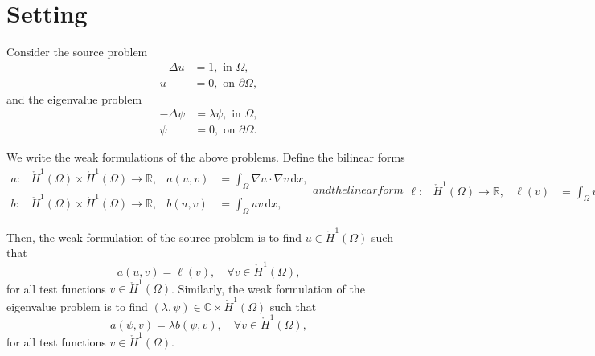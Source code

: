 \section{Setting}

Consider the source problem
\begin{subequations}
\begin{align}
    \label{eq:source}
    - \Delta u  & = 1, \text{ in } \Omega, \\
    u & = 0, \text{ on } \partial \Omega,
\end{align}
\end{subequations}
and the eigenvalue problem
\begin{subequations}
\begin{align}
    \label{eq:eigenvalue}
    - \Delta \psi & = \lambda \psi, \text{ in } \Omega, \\
    \psi & = 0, \text{ on } \partial \Omega.
\end{align}
\end{subequations}

We write the weak formulations of the above problems.
Define the bilinear forms
\begin{subequations}
\begin{align}
    a: & \mathring{H}^1(\Omega) \times \mathring{H}^1(\Omega) \to \mathbb{R}, &
    a(u, v) & = \int_{\Omega} \nabla u \cdot \nabla v \, \mathrm{d}x, \\
    b: & \mathring{H}^1(\Omega) \times \mathring{H}^1(\Omega) \to \mathbb{R}, &
    b(u, v) & = \int_{\Omega} u v \, \mathrm{d}x,
\end{align}
and the linear form
\begin{align}
    \ell: & \mathring{H}^1(\Omega) \to \mathbb{R}, &
    \ell (v) & = \int_{\Omega} v \, \mathrm{d}x.
\end{align}
\end{subequations}

Then, the weak formulation of the source problem is to find \(u \in \mathring{H}^1(\Omega)\) such that
\begin{equation}
    \label{eq:source_weak}
    a(u, v) = \ell(v), \quad \forall v \in \mathring{H}^1(\Omega),
\end{equation}
for all test functions \(v \in \mathring{H}^1(\Omega)\).
Similarly, the weak formulation of the eigenvalue problem is to find \((\lambda, \psi) \in \mathbb{C} \times \mathring{H}^1(\Omega)\) such that
\begin{equation}
    \label{eq:eigenvalue_weak}
    a(\psi, v) = \lambda b(\psi, v), \quad \forall v \in \mathring{H}^1(\Omega),
\end{equation}
for all test functions \(v \in \mathring{H}^1(\Omega)\).

